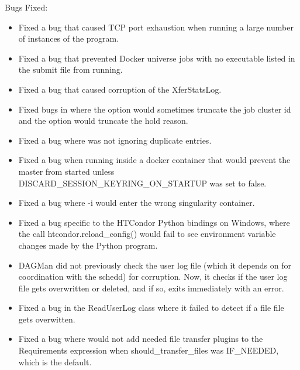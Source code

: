 \noindent Bugs Fixed:

\begin{itemize}

\item Fixed a bug that caused TCP port exhaustion when running a large
number of instances of the  program.

\item Fixed a bug that prevented Docker universe jobs with no
executable listed in the submit file from running.

\item Fixed a bug that caused corruption of the XferStatsLog.

\item Fixed bugs in  where the  option would sometimes
truncate the job cluster id and the  option would truncate the hold reason.

\item Fixed a bug where  was not ignoring
duplicate entries.

\item Fixed a bug when running inside a docker container that would prevent
the master from started unless DISCARD\_SESSION\_KEYRING\_ON\_STARTUP was set to
false.

\item Fixed a bug where  -i would enter the wrong singularity
container.

\item Fixed a bug specific to the HTCondor Python bindings on Windows, where
the call htcondor.reload\_config() would fail to see 
environment variable changes made by the Python program.

\item DAGMan did not previously check the user log file (which it depends on for
coordination with the schedd) for corruption. Now, it checks if the user log 
file gets overwritten or deleted, and if so, exits immediately with an error.

\item Fixed a bug in the ReadUserLog class where it failed to detect if a file
file gets overwitten.

\item Fixed a bug where  would not add needed file transfer plugins to the
Requirements expression when should\_transfer\_files was IF\_NEEDED, which is the default.


\end{itemize}
